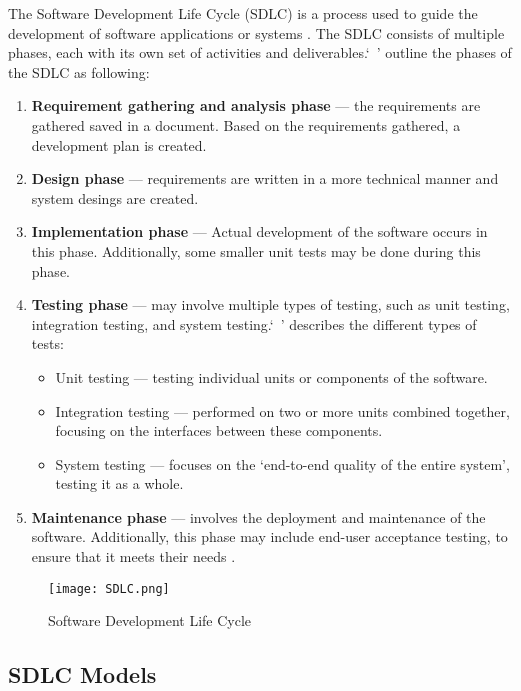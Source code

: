 The Software Development Life Cycle (SDLC) is a process used to guide the development of software applications or systems \parencite{sdlc1}. The SDLC consists of multiple phases, each with its own set of activities and deliverables.`\ '\textcite{sdlc2} outline the phases of the SDLC as following:
\begin{enumerate}
    \item \textbf{Requirement gathering and analysis phase} --- the requirements are gathered saved in a document. Based on the requirements gathered, a development plan is created.
    \item \textbf{Design phase} --- requirements are written in a more technical manner and system desings are created. 
    \item \textbf{Implementation phase} --- Actual development of the software occurs in this phase. Additionally, some smaller unit tests may be done during this phase.
    \item \textbf{Testing phase} --- may involve multiple types of testing, such as unit testing, integration testing, and system testing.`\ '\textcite{testing} describes the different types of tests:
    \begin{itemize}
    \item Unit testing --- testing individual units or components of the software.
    \item Integration testing --- performed on two or more units combined together, focusing on the interfaces between these components.
    \item System testing --- focuses on the `end-to-end quality of the entire system', testing it as a whole.
    \end{itemize}
    \item \textbf{Maintenance phase} --- involves the deployment and maintenance of the software. Additionally, this phase may include end-user acceptance testing, to ensure that it meets their needs \parencite{testing}. 
\end{enumerate}

\begin{figure}[ht]
    \centering
    \texttt{[image: SDLC.png]}
    \caption{Software Development Life Cycle}\label{fig:sdlc}
\end{figure}

\newpage

\subsection{SDLC Models}


